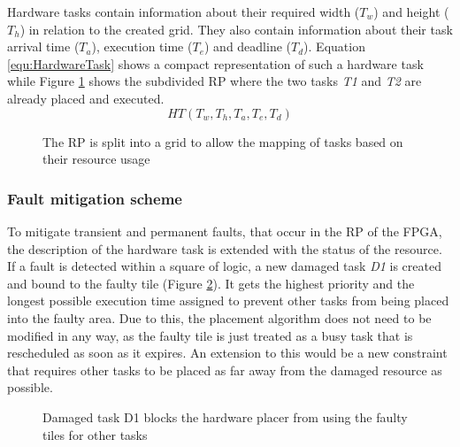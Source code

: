Hardware tasks contain information about their required width ($T_w$) and height ($T_h$) in relation to the created grid. 
They also contain information about their task arrival time ($T_a$), execution time ($T_e$) and deadline ($T_d$).
Equation \ref{equ:HardwareTask} shows a compact representation of such a hardware task while Figure \ref{fig:TaskGrid} shows the subdivided \gls{RP} where the two tasks \textit{T1} and \textit{T2} are already placed and executed.
\begin{equation}\label{equ:HardwareTask}
    HT(T_w, T_h, T_a, T_e, T_d)
\end{equation}
\begin{figure}
    \centering
    \scalebox{0.5}{
    \resizebox{\smallColumnWidth}{!}{}
    }
    \caption{The \gls{RP} is split into a grid to allow the mapping of tasks based on their resource usage}\label{fig:TaskGrid}
\end{figure}
\subsubsection{Fault mitigation scheme}
To mitigate transient and permanent faults, that occur in the \gls{RP} of the \gls{FPGA}, the description of the hardware task is extended with the status of the resource.
If a fault is detected within a square of logic, a new damaged task \textit{D1} is created and bound to the faulty tile (Figure \ref{fig:TaskGridFault}).
It gets the highest priority and the longest possible execution time assigned to prevent other tasks from being placed into the faulty area.
Due to this, the placement algorithm does not need to be modified in any way, as the faulty tile is just treated as a busy task that is rescheduled as soon as it expires.
An extension to this would be a new constraint that requires other tasks to be placed as far away from the damaged resource as possible. 
\begin{figure}
    \centering
    \scalebox{0.5}{
    \resizebox{\smallColumnWidth}{!}{}
    }
    \caption{Damaged task D1 blocks the hardware placer from using the faulty tiles for other tasks}\label{fig:TaskGridFault}
\end{figure}
 
